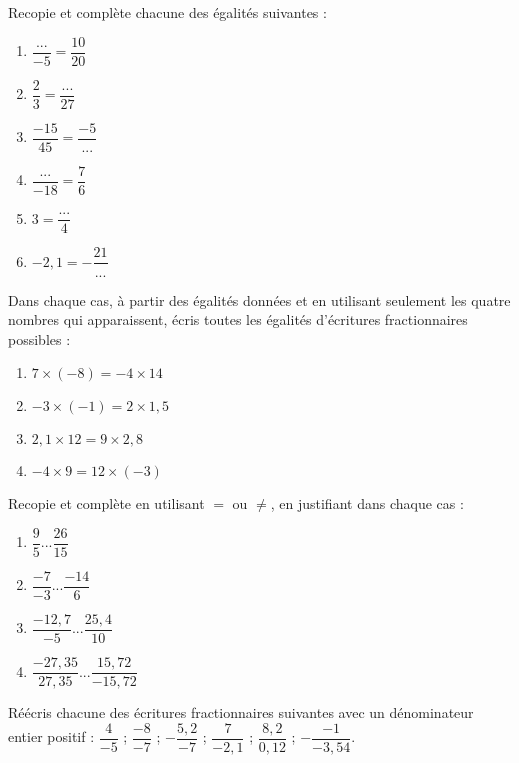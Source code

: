\begin{exercice}[Égalités]
Recopie et complète chacune des égalités suivantes :
\begin{enumerate}
\item $\dfrac{...}{-5}=\dfrac{10}{20}$
\item $\dfrac{2}{3}=\dfrac{...}{27}$
\item $\dfrac{-15}{45}=\dfrac{-5}{...}$
\item $\dfrac{...}{-18}=\dfrac{7}{6}$
\item $3=\dfrac{...}{4}$
\item $-2,1=-\dfrac{21}{...}$
\end{enumerate}
\end{exercice}




\begin{exercice}
Dans chaque cas, à partir des égalités données et en utilisant seulement les quatre nombres qui apparaissent, écris toutes les égalités d'écritures fractionnaires possibles :
\begin{enumerate}
\item $7 \times (-8) = -4 \times 14$
\item $-3 \times (-1) = 2 \times 1,5$
\item $2,1 \times 12 = 9 \times 2,8$
\item $-4 \times 9 = 12 \times (-3)$
\end{enumerate}
\end{exercice}




\begin{exercice}[Égalité ?]
Recopie et complète en utilisant $=$ ou $\neq$, en justifiant dans chaque cas :
\begin{enumerate}
\item $\dfrac{9}{5} ... \dfrac{26}{15}$ 
\item $\dfrac{-7}{-3} ... \dfrac{-14}{6}$
\item $\dfrac{-12,7}{-5} ... \dfrac{25,4}{10}$
\item $\dfrac{-27,35}{27,35} ... \dfrac{15,72}{-15,72}$
\end{enumerate}
\end{exercice}





\begin{exercice}
Réécris chacune des écritures fractionnaires suivantes avec un dénominateur entier positif :
$\dfrac{4}{-5}$ ; $\dfrac{-8}{-7}$ ; $-\dfrac{5,2}{-7}$ ; $\dfrac{7}{-2,1}$ ; $\dfrac{8,2}{0,12}$ ; $-\dfrac{-1}{-3,54}$.
\end{exercice}





